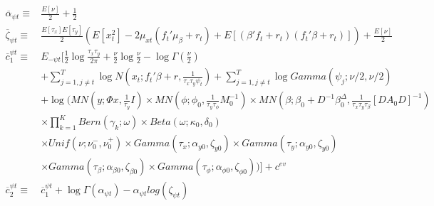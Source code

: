 \documentclass[11pt]{article}
\begin{document}
\begin{align*}
	\overline{\alpha}_{\psi t}\equiv&\frac{E\left[\nu\right]}{2}+\frac{1}{2}\\\overline{\zeta}_{\psi t}\equiv&\frac{E\left[\tau_{x}\right]E\left[\tau_{y}\right]}{2}\left(E\left[x_{t}^{2}\right]-2\mu_{xt}\left(f_{t}'\mu_{\beta}+r_{t}\right)+E\left[\left(\beta'f_{t}+r_{t}\right)\left(f_{t}'\beta+r_{t}\right)\right]\right)+\frac{E\left[\nu\right]}{2}\\\overline{c}_{1}^{\psi t}\equiv&E_{-\psi t}\Bigg[\frac{1}{2}\log\frac{\tau_{x}\tau_{y}}{2\pi}+\frac{\nu}{2}\log\frac{\nu}{2}-\log\Gamma\left(\frac{\nu}{2}\right)\\&+\sum_{j=1,j\ne t}^{T}\log N\left(x_{t};f_{t}'\beta+r,\frac{1}{\tau_{x}\tau_{y}\psi_{t}}\right)+\sum_{j=1,j\ne t}^{T}\log Gamma\left(\psi_{j};\nu/2,\nu/2\right)\\&+\log\Bigg(MN\left(y;\Phi x,\frac{1}{\tau_{y}}I\right)\times MN\left(\phi;\phi_{0},\frac{1}{\tau_{y}\tau_{\phi}}M_{0}^{-1}\right)\times MN\left(\beta;\beta_{0}+D^{-1}\beta_{0}^{\Delta},\frac{1}{\tau_{x}\tau_{y}\tau_{\beta}}\left[DA_{0}D\right]^{-1}\right)\\&\times\prod_{k=1}^{K}Bern\left(\gamma_{k};\omega\right)\times Beta\left(\omega;\kappa_{0},\delta_{0}\right)\\&\times Unif\left(\nu;\nu_{0}^{-},\nu_{0}^{+}\right)\times Gamma\left(\tau_{x};\alpha_{y0},\zeta_{y0}\right)\times Gamma\left(\tau_{y};\alpha_{y0},\zeta_{y0}\right)\\&\times Gamma\left(\tau_{\beta};\alpha_{\beta0},\zeta_{\beta0}\right)\times Gamma\left(\tau_{\phi};\alpha_{\phi0},\zeta_{\phi0}\right)\Bigg)\Bigg]+c^{ev}\\\overline{c}_{2}^{\psi t}\equiv&\overline{c}_{1}^{\psi t}+\log\Gamma\left(\alpha_{\psi t}\right)-\alpha_{\psi t}log\left(\zeta_{\psi t}\right)
\end{align*}
\end{document}
